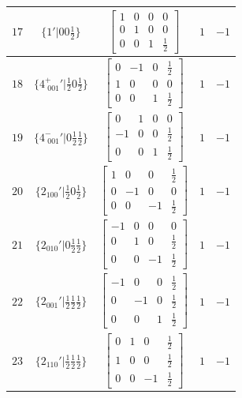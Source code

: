 \documentclass[fleqn,8pt]{jsarticle}
\begin{document}
\begin{longtable}{ccccc}
$ 17 $ & $ \{1{}'|0 0 \frac{1}{2}\} $ & $ \begin{bmatrix} 1 & 0 & 0 & 0 \\ 0 & 1 & 0 & 0 \\ 0 & 0 & 1 & \frac{1}{2} \end{bmatrix} $ & $ 1 $ & $ -1 $ \\ \hline
$ 18 $ & $ \{4^{+}_{\,\,001}{}'|\frac{1}{2} 0 \frac{1}{2}\} $ & $ \begin{bmatrix} 0 & -1 & 0 & \frac{1}{2} \\ 1 & 0 & 0 & 0 \\ 0 & 0 & 1 & \frac{1}{2} \end{bmatrix} $ & $ 1 $ & $ -1 $ \\ \hline
$ 19 $ & $ \{4^{-}_{\,\,001}{}'|0 \frac{1}{2} \frac{1}{2}\} $ & $ \begin{bmatrix} 0 & 1 & 0 & 0 \\ -1 & 0 & 0 & \frac{1}{2} \\ 0 & 0 & 1 & \frac{1}{2} \end{bmatrix} $ & $ 1 $ & $ -1 $ \\ \hline
$ 20 $ & $ \{2{}_{100}{}'|\frac{1}{2} 0 \frac{1}{2}\} $ & $ \begin{bmatrix} 1 & 0 & 0 & \frac{1}{2} \\ 0 & -1 & 0 & 0 \\ 0 & 0 & -1 & \frac{1}{2} \end{bmatrix} $ & $ 1 $ & $ -1 $ \\ \hline
$ 21 $ & $ \{2{}_{010}{}'|0 \frac{1}{2} \frac{1}{2}\} $ & $ \begin{bmatrix} -1 & 0 & 0 & 0 \\ 0 & 1 & 0 & \frac{1}{2} \\ 0 & 0 & -1 & \frac{1}{2} \end{bmatrix} $ & $ 1 $ & $ -1 $ \\ \hline
$ 22 $ & $ \{2{}_{001}{}'|\frac{1}{2} \frac{1}{2} \frac{1}{2}\} $ & $ \begin{bmatrix} -1 & 0 & 0 & \frac{1}{2} \\ 0 & -1 & 0 & \frac{1}{2} \\ 0 & 0 & 1 & \frac{1}{2} \end{bmatrix} $ & $ 1 $ & $ -1 $ \\ \hline
$ 23 $ & $ \{2{}_{110}{}'|\frac{1}{2} \frac{1}{2} \frac{1}{2}\} $ & $ \begin{bmatrix} 0 & 1 & 0 & \frac{1}{2} \\ 1 & 0 & 0 & \frac{1}{2} \\ 0 & 0 & -1 & \frac{1}{2} \end{bmatrix} $ & $ 1 $ & $ -1 $ \\ \hline

\end{longtable}
\end{document}
